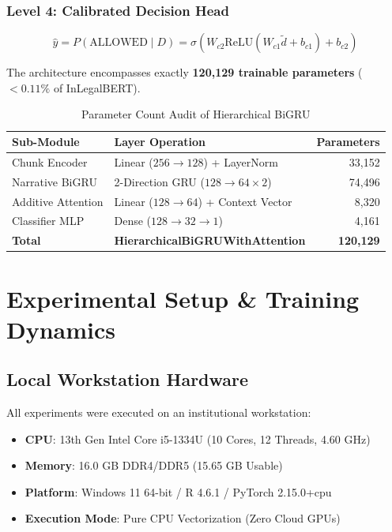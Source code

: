 \documentclass[journal,10pt,twocolumn]{IEEEtran}
\begin{document}
\subsubsection{Level 4: Calibrated Decision Head}
\begin{equation}
\hat{y} = P(\text{ALLOWED} \mid D) = \sigma(W_{c2} \text{ReLU}(W_{c1} \tilde{d} + b_{c1}) + b_{c2})
\end{equation}

The architecture encompasses exactly \textbf{120,129 trainable parameters} ($< 0.11\%$ of InLegalBERT).

\begin{table}[t]
\caption{Parameter Count Audit of Hierarchical BiGRU}
\label{tab:params}
\centering
\begin{tabularx}{\columnwidth}{llr}
\toprule
\textbf{Sub-Module} & \textbf{Layer Operation} & \textbf{Parameters} \\
\midrule
Chunk Encoder & Linear ($256 \rightarrow 128$) + LayerNorm & 33,152 \\
Narrative BiGRU & 2-Direction GRU ($128 \rightarrow 64 \times 2$) & 74,496 \\
Additive Attention & Linear ($128 \rightarrow 64$) + Context Vector & 8,320 \\
Classifier MLP & Dense ($128 \rightarrow 32 \rightarrow 1$) & 4,161 \\
\midrule
\textbf{Total} & \textbf{HierarchicalBiGRUWithAttention} & \textbf{120,129} \\
\bottomrule
\end{tabularx}
\end{table}

\section{Experimental Setup & Training Dynamics}
\subsection{Local Workstation Hardware}
All experiments were executed on an institutional workstation:
\begin{itemize}
    \item \textbf{CPU}: 13th Gen Intel Core i5-1334U (10 Cores, 12 Threads, 4.60 GHz)
    \item \textbf{Memory}: 16.0 GB DDR4/DDR5 (15.65 GB Usable)
    \item \textbf{Platform}: Windows 11 64-bit / R 4.6.1 / PyTorch 2.15.0+cpu
    \item \textbf{Execution Mode}: Pure CPU Vectorization (Zero Cloud GPUs)
\end{itemize}
\end{document}

